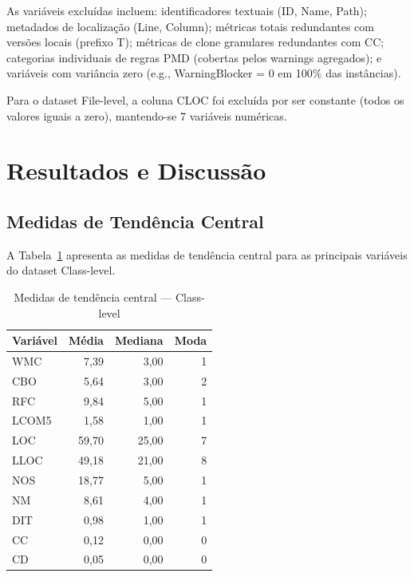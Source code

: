 \documentclass[12pt]{article}
\begin{document}
As variáveis excluídas incluem: identificadores textuais (ID, Name, Path); metadados de localização (Line, Column); métricas totais redundantes com versões locais (prefixo T); métricas de clone granulares redundantes com CC; categorias individuais de regras PMD (cobertas pelos warnings agregados); e variáveis com variância zero (e.g., WarningBlocker = 0 em 100\% das instâncias).

Para o dataset File-level, a coluna CLOC foi excluída por ser constante (todos os valores iguais a zero), mantendo-se 7 variáveis numéricas.

\section{Resultados e Discussão} \label{sec:resultados}

\subsection{Medidas de Tendência Central}

A Tabela~\ref{tab:tendencia_class} apresenta as medidas de tendência central para as principais variáveis do dataset Class-level.

\begin{table}[H]
\centering
\caption{Medidas de tendência central --- Class-level}
\label{tab:tendencia_class}
\small
\begin{tabular}{lrrr}
\toprule
\textbf{Variável} & \textbf{Média} & \textbf{Mediana} & \textbf{Moda} \\
\midrule
WMC   & 7,39   & 3,00   & 1 \\
CBO   & 5,64   & 3,00   & 2 \\
RFC   & 9,84   & 5,00   & 1 \\
LCOM5 & 1,58   & 1,00   & 1 \\
LOC   & 59,70  & 25,00  & 7 \\
LLOC  & 49,18  & 21,00  & 8 \\
NOS   & 18,77  & 5,00   & 1 \\
NM    & 8,61   & 4,00   & 1 \\
DIT   & 0,98   & 1,00   & 1 \\
CC    & 0,12   & 0,00   & 0 \\
CD    & 0,05   & 0,00   & 0 \\
\bottomrule
\end{tabular}
\end{table}
\end{document}

